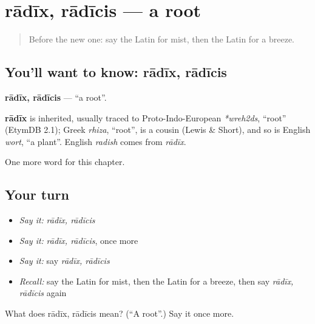 \section[rādīx, rādīcis]{rādīx, rādīcis — a root}

\label{lesson:LA-C223-radix}



\begin{quote}
Before the new one: say the Latin for mist, then the Latin for a breeze.
\end{quote}

\subsection*{You'll want to know: rādīx, rādīcis}
\textbf{rādīx, rādīcis} — \textquotedblleft{}a root\textquotedblright{}.

\begin{cousinweb}
\textbf{rādīx} is inherited, usually traced to Proto-Indo-European \emph{*wreh2ds}, \textquotedblleft{}root\textquotedblright{} (EtymDB 2.1); Greek \emph{rhiza}, \textquotedblleft{}root\textquotedblright{}, is a cousin (Lewis \& Short), and so is English \emph{wort}, \textquotedblleft{}a plant\textquotedblright{}. English \emph{radish} comes from \emph{rādīx}.
\end{cousinweb}

\begin{grammarlens}[title={What you've built}]
One more word for this chapter.
\end{grammarlens}

\subsection*{Your turn}
\begin{itemize}
\raggedright
  \item \emph{Say it:} \emph{rādīx, rādīcis}
  \item \emph{Say it:} \emph{rādīx, rādīcis}, once more
  \item \emph{Say it:} say \emph{rādīx, rādīcis}
  \item \emph{Recall:} say the Latin for mist, then the Latin for a breeze, then say \emph{rādīx, rādīcis} again
\end{itemize}

\begin{tcolorbox}[breakable,colback=teal!4,colframe=teal!35!black,title={Before you move on}]
What does rādīx, rādīcis mean? (\textquotedblleft{}A root\textquotedblright{}.) Say it once more.
\end{tcolorbox}
